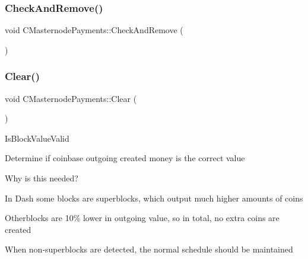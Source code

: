\mbox{\label{class_c_masternode_payments_a33e0570c7554fa461f407649fb6bbbcd}} 
\subsubsection{\texorpdfstring{Check\+And\+Remove()}{CheckAndRemove()}}
{\footnotesize\ttfamily void C\+Masternode\+Payments\+::\+Check\+And\+Remove (\begin{DoxyParamCaption}{ }\end{DoxyParamCaption})}

\mbox{\label{class_c_masternode_payments_ace5711bd6c2b17cd1e35e0924aae4268}} 
\subsubsection{\texorpdfstring{Clear()}{Clear()}}
{\footnotesize\ttfamily void C\+Masternode\+Payments\+::\+Clear (\begin{DoxyParamCaption}{ }\end{DoxyParamCaption})}

Is\+Block\+Value\+Valid

Determine if coinbase outgoing created money is the correct value

Why is this needed?
\begin{DoxyItemize}
\item In Dash some blocks are superblocks, which output much higher amounts of coins
\item Otherblocks are 10\% lower in outgoing value, so in total, no extra coins are created
\item When non-\/superblocks are detected, the normal schedule should be maintained 
\end{DoxyItemize}\mbox{\label{class_c_masternode_payments_a6c323905008eeba029283b2467463b9e}} 
